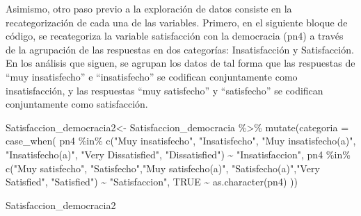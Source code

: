 \documentclass[
]{book}
\newenvironment{Shaded}{\begin{snugshade}}{\end{snugshade}}
\newcommand{\AttributeTok}[1]{\textcolor[rgb]{0.77,0.63,0.00}{#1}}
\newcommand{\ConstantTok}[1]{\textcolor[rgb]{0.00,0.00,0.00}{#1}}
\newcommand{\FunctionTok}[1]{\textcolor[rgb]{0.00,0.00,0.00}{#1}}
\newcommand{\NormalTok}[1]{#1}
\newcommand{\OtherTok}[1]{\textcolor[rgb]{0.56,0.35,0.01}{#1}}
\newcommand{\SpecialCharTok}[1]{\textcolor[rgb]{0.00,0.00,0.00}{#1}}
\newcommand{\StringTok}[1]{\textcolor[rgb]{0.31,0.60,0.02}{#1}}
\begin{document}
Asimismo, otro paso previo a la exploración de datos consiste en la recategorización de cada una de las variables. Primero, en el siguiente bloque de código, se recategoriza la variable satisfacción con la democracia (pn4) a través de la agrupación de las respuestas en dos categorías: Insatisfacción y Satisfacción. En los análisis que siguen, se agrupan los datos de tal forma que las respuestas de ``muy insatisfecho'' e ``insatisfecho'' se codifican conjuntamente como insatisfacción, y las respuestas ``muy satisfecho'' y ``satisfecho'' se codifican conjuntamente como satisfacción.

\begin{Shaded}
\begin{Highlighting}[]
\NormalTok{Satisfaccion\_democracia2}\OtherTok{\textless{}{-}}\NormalTok{ Satisfaccion\_democracia }\SpecialCharTok{\%\textgreater{}\%}
\FunctionTok{mutate}\NormalTok{(}\AttributeTok{categoria =} \FunctionTok{case\_when}\NormalTok{(}
\NormalTok{        pn4 }\SpecialCharTok{\%in\%} \FunctionTok{c}\NormalTok{(}\StringTok{"Muy insatisfecho"}\NormalTok{, }\StringTok{"Insatisfecho"}\NormalTok{, }\StringTok{"Muy insatisfecho(a)"}\NormalTok{,}
                   \StringTok{"Insatisfecho(a)"}\NormalTok{, }\StringTok{"Very Dissatisfied"}\NormalTok{, }\StringTok{"Dissatisfied"}\NormalTok{) }\SpecialCharTok{\textasciitilde{}} \StringTok{"Insatisfaccion"}\NormalTok{,}
\NormalTok{        pn4 }\SpecialCharTok{\%in\%} \FunctionTok{c}\NormalTok{(}\StringTok{"Muy satisfecho"}\NormalTok{, }\StringTok{"Satisfecho"}\NormalTok{,}\StringTok{"Muy satisfecho(a)"}\NormalTok{,}
                   \StringTok{"Satisfecho(a)"}\NormalTok{,}\StringTok{"Very Satisfied"}\NormalTok{, }\StringTok{"Satisfied"}\NormalTok{) }\SpecialCharTok{\textasciitilde{}} \StringTok{"Satisfaccion"}\NormalTok{,}
        \ConstantTok{TRUE} \SpecialCharTok{\textasciitilde{}} \FunctionTok{as.character}\NormalTok{(pn4)}
\NormalTok{    )) }
\end{Highlighting}
\end{Shaded}

\begin{Shaded}
\begin{Highlighting}[]
\NormalTok{Satisfaccion\_democracia2}
\end{Highlighting}
\end{Shaded}
\end{document}
